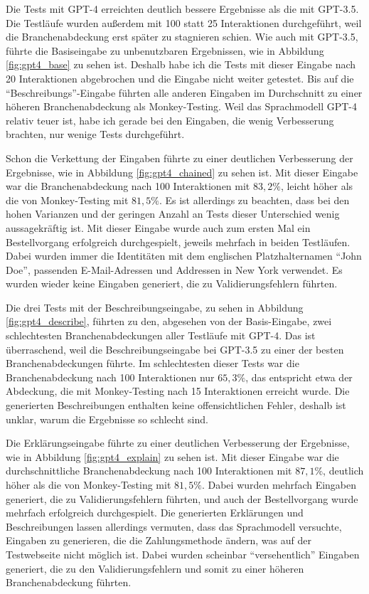 Die Tests mit GPT-4 erreichten deutlich bessere Ergebnisse als die mit GPT-3.5.
Die Testläufe wurden außerdem mit 100 statt 25 Interaktionen durchgeführt, weil die Branchenabdeckung erst später zu stagnieren schien.
Wie auch mit GPT-3.5, führte die Basiseingabe zu unbenutzbaren Ergebnissen, wie in Abbildung \ref{fig:gpt4_base} zu sehen ist.
Deshalb habe ich die Tests mit dieser Eingabe nach 20 Interaktionen abgebrochen und die Eingabe nicht weiter getestet.
Bis auf die \enquote{Beschreibungs}-Eingabe führten alle anderen Eingaben im Durchschnitt zu einer höheren Branchenabdeckung als Monkey-Testing.
Weil das Sprachmodell GPT-4 relativ teuer ist, habe ich gerade bei den Eingaben, die wenig Verbesserung brachten, nur wenige Tests durchgeführt.

Schon die Verkettung der Eingaben führte zu einer deutlichen Verbesserung der Ergebnisse, wie in Abbildung \ref{fig:gpt4_chained} zu sehen ist.
Mit dieser Eingabe war die Branchenabdeckung nach 100 Interaktionen mit $83{,}2\%$, leicht höher als die von Monkey-Testing mit $81{,}5\%$.
Es ist allerdings zu beachten, dass bei den hohen Varianzen und der geringen Anzahl an Tests dieser Unterschied wenig aussagekräftig ist.
Mit dieser Eingabe wurde auch zum ersten Mal ein Bestellvorgang erfolgreich durchgespielt, jeweils mehrfach in beiden Testläufen.
Dabei wurden immer die Identitäten mit dem englischen Platzhalternamen \enquote{John Doe}, passenden E-Mail-Adressen und Addressen in New York verwendet.
Es wurden wieder keine Eingaben generiert, die zu Validierungsfehlern führten.

Die drei Tests mit der Beschreibungseingabe, zu sehen in Abbildung \ref{fig:gpt4_describe}, führten zu den, abgesehen von der Basis-Eingabe, zwei schlechtesten Branchenabdeckungen aller Testläufe mit GPT-4.
Das ist überraschend, weil die Beschreibungseingabe bei GPT-3.5 zu einer der besten Branchenabdeckungen führte.
Im schlechtesten dieser Tests war die Branchenabdeckung nach 100 Interaktionen nur $65{,}3\%$, das entspricht etwa der Abdeckung, die mit Monkey-Testing nach 15 Interaktionen erreicht wurde.
Die generierten Beschreibungen enthalten keine offensichtlichen Fehler, deshalb ist unklar, warum die Ergebnisse so schlecht sind.

Die Erklärungseingabe führte zu einer deutlichen Verbesserung der Ergebnisse, wie in Abbildung \ref{fig:gpt4_explain} zu sehen ist.
Mit dieser Eingabe war die durchschnittliche Branchenabdeckung nach 100 Interaktionen mit $87{,}1\%$, deutlich höher als die von Monkey-Testing mit $81{,}5\%$.
Dabei wurden mehrfach Eingaben generiert, die zu Validierungsfehlern führten, und auch der Bestellvorgang wurde mehrfach erfolgreich durchgespielt.
Die generierten Erklärungen und Beschreibungen lassen allerdings vermuten, dass das Sprachmodell versuchte, Eingaben zu generieren, die die Zahlungsmethode ändern, was auf der Testwebseite nicht möglich ist.
Dabei wurden scheinbar \enquote{versehentlich} Eingaben generiert, die zu den Validierungsfehlern und somit zu einer höheren Branchenabdeckung führten.

